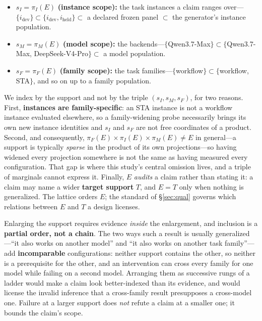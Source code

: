 \documentclass{article}
\begin{document}
\begin{itemize}
\item $s_I=\pi_I(E)$ \textbf{(instance scope):} the task instances a claim ranges over---$\{i_{\mathrm{dev}}\}\subset\{i_{\mathrm{dev}},i_{\mathrm{held}}\}\subset$ a declared frozen panel $\subset$ the generator's instance population.
\item $s_M=\pi_M(E)$ \textbf{(model scope):} the backends---$\{$Qwen3.7-Max$\}\subset\{$Qwen3.7-Max, DeepSeek-V4-Pro$\}\subset$ a model population.
\item $s_F=\pi_F(E)$ \textbf{(family scope):} the task families---$\{$workflow$\}\subset\{$workflow, STA$\}$, and so on up to a family population.
\end{itemize}

We index by the support and not by the triple $(s_I,s_M,s_F)$, for two reasons. First, \textbf{instances are family-specific}: an STA instance is not a workflow instance evaluated elsewhere, so a family-widening probe necessarily brings its own new instance identities and $s_I$ and $s_F$ are not free coordinates of a product. Second, and consequently, $\pi_F(E)\times\pi_I(E)\times\pi_M(E)\neq E$ in general---a support is typically \emph{sparse} in the product of its own projections---so having widened every projection somewhere is not the same as having measured every configuration. That gap is where this study's central omission lives, and a triple of marginals cannot express it. Finally, $E$ \emph{audits} a claim rather than stating it: a claim may name a wider \textbf{target support} $T$, and $E=T$ only when nothing is generalized. The lattice orders $E$; the standard of \S\ref{sec:qual} governs which relations between $E$ and $T$ a design licenses.

Enlarging the support requires evidence \emph{inside} the enlargement, and inclusion is a \textbf{partial order, not a chain}. The two ways such a result is usually generalized---``it also works on another model'' and ``it also works on another task family''---add \textbf{incomparable} configurations: neither support contains the other, so neither is a prerequisite for the other, and an intervention can cross every family for one model while failing on a second model. Arranging them as successive rungs of a ladder would make a claim look better-indexed than its evidence, and would license the invalid inference that a cross-family result presupposes a cross-model one. Failure at a larger support does \emph{not} refute a claim at a smaller one; it bounds the claim's scope.
\end{document}
